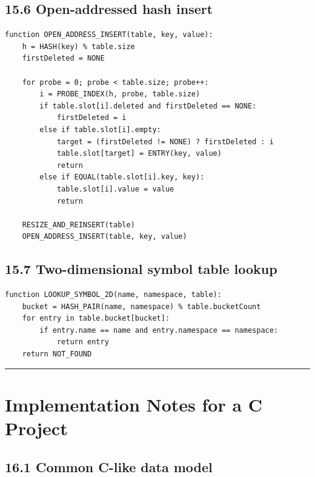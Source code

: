 \documentclass[10pt,letterpaper]{article}
\begin{document}
\subsection*{15.6 Open-addressed hash insert}

\begin{verbatim}
function OPEN_ADDRESS_INSERT(table, key, value):
    h = HASH(key) % table.size
    firstDeleted = NONE

    for probe = 0; probe < table.size; probe++:
        i = PROBE_INDEX(h, probe, table.size)
        if table.slot[i].deleted and firstDeleted == NONE:
            firstDeleted = i
        else if table.slot[i].empty:
            target = (firstDeleted != NONE) ? firstDeleted : i
            table.slot[target] = ENTRY(key, value)
            return
        else if EQUAL(table.slot[i].key, key):
            table.slot[i].value = value
            return

    RESIZE_AND_REINSERT(table)
    OPEN_ADDRESS_INSERT(table, key, value)
\end{verbatim}

\subsection*{15.7 Two-dimensional symbol table lookup}

\begin{verbatim}
function LOOKUP_SYMBOL_2D(name, namespace, table):
    bucket = HASH_PAIR(name, namespace) % table.bucketCount
    for entry in table.bucket[bucket]:
        if entry.name == name and entry.namespace == namespace:
            return entry
    return NOT_FOUND
\end{verbatim}

\medskip\hrule\medskip

\clearpage
\section{Implementation Notes for a C Project}

\subsection*{16.1 Common C-like data model}
\end{document}
